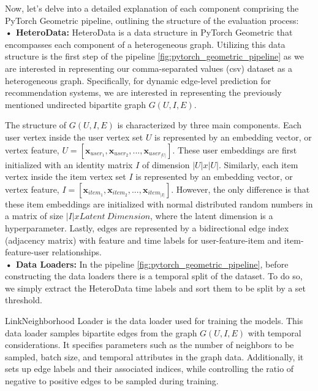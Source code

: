 \documentclass{scrartcl}
\begin{document}
Now, let's delve into a detailed explanation of each component comprising the PyTorch Geometric pipeline, outlining the structure of the evaluation process: \\

\textbf{• HeteroData:} HeteroData is a data structure in PyTorch Geometric that encompasses each component of a heterogeneous graph. Utilizing this data structure is the first step of the pipeline \ref{fig:pytorch_geometric_pipeline} as we are interested in representing our comma-separated values (csv) dataset as a heterogeneous graph. Specifically, for dynamic edge-level prediction for recommendation systems, we are interested in representing the previously mentioned undirected bipartite graph $G(U,I,E)$. 

The structure of $G(U,I,E)$ is characterized by three main components. Each user vertex inside the user vertex set $U$ is represented by an embedding vector, or vertex feature, $U=[\mathbf{x}_{user_{1}},\mathbf{x}_{user_{2}}, ..., \mathbf{x}_{user_{|U|}}]$. These user embeddings are first initialized with an identity matrix $I$ of dimension $|U|x|U|$. Similarly, each item vertex inside the item vertex set $I$ is represented by an embedding vector, or vertex feature, $I=[\mathbf{x}_{item_{1}},\mathbf{x}_{item_{2}}, ..., \mathbf{x}_{item_{|I|}}]$. However, the only difference is that these item embeddings are initialized with normal distributed random numbers in a matrix of size $|I|xLatent \ Dimension$, where the latent dimension is a hyperparameter. Lastly, edges are represented by a bidirectional edge index (adjacency matrix) with feature and time labels for user-feature-item and item-feature-user relationships. \\

\textbf{• Data Loaders:} In the pipeline \ref{fig:pytorch_geometric_pipeline}, before constructing the data loaders there is a temporal split of the dataset. To do so, we simply extract the HeteroData time labels and sort them to be split by a set threshold.

LinkNeighborhood Loader is the data loader used for training the models. This data loader samples bipartite edges from the graph $G(U,I,E)$ with temporal considerations. It specifies parameters such as the number of neighbors to be sampled, batch size, and temporal attributes in the graph data. Additionally, it sets up edge labels and their associated indices, while controlling the ratio of negative to positive edges to be sampled during training. 
\end{document}
